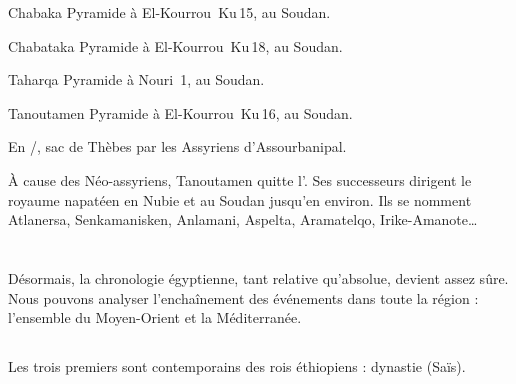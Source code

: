 \begin{listerois}
  \item [Chabaka \datation{(c.~\anorange{716}{702})}] 
        Pyramide à El-Kourrou~Ku\,15, au Soudan.
  \item [Chabataka \datation{(c.~\anorange{702}{690})}] 
        Pyramide à El-Kourrou~Ku\,18, au Soudan.
  \item [Taharqa \datation{(c.~\anorange{690}{664})}] 
        Pyramide à Nouri~\num{1}, au Soudan.
  \item [Tanoutamen \datation{(c.~\anorange{664}{656})}] 
        Pyramide à El-Kourrou~Ku\,16, au Soudan.
\end{listerois}

En /, sac de Thèbes par les Assyriens 
d'Assourbanipal.

À cause des Néo-assyriens, Tanoutamen quitte l'\kmt. 
Ses successeurs dirigent le royaume napatéen en Nubie et au Soudan 
jusqu'en  environ.
Ils se nomment Atlanersa, Senkamanisken, Anlamani, Aspelta, 
Aramatelqo, Irike-Amanote\dots

\section{\LP}

Désormais, la chronologie égyptienne, tant relative qu'absolue, 
devient assez sûre. Nous pouvons analyser l'enchaînement des 
événements dans toute la région : l'ensemble du Moyen-Orient et 
la Méditerranée.

\subsection{\texorpdfstring{}{XXVIe dynastie}}


Les trois premiers sont contemporains des rois éthiopiens : dynastie 
 (Saïs).

